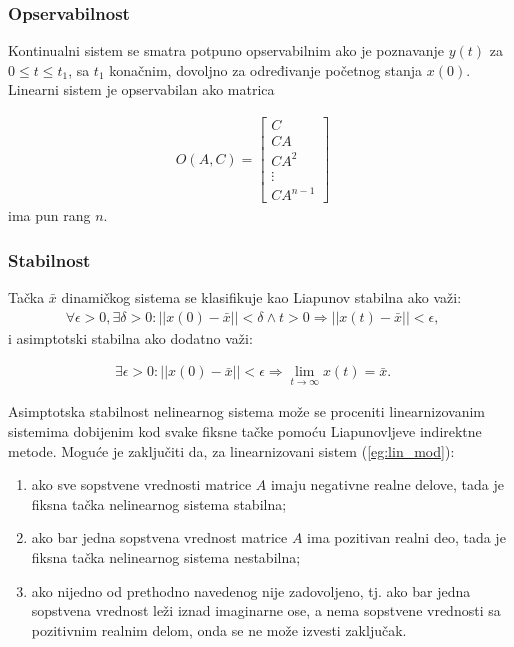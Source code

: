 \documentclass[a4paper,11pt]{article}
\theoremstyle{definition} \newtheorem{deff}{Definicija}[section]
\theoremstyle{definition} \newtheorem{prim}[deff]{Primer}
\theoremstyle{plain} \newtheorem{teor}[deff]{Teorema}
\begin{document}
	
	\subsubsection{Opservabilnost}
	
	Kontinualni sistem se smatra potpuno opservabilnim ako je poznavanje $y(t)$ za $0 \leq t \leq t_1$, sa $t_1$ konačnim, dovoljno za određivanje početnog stanja $x(0)$. \\
	
	Linearni sistem je opservabilan ako matrica
	
	\begin{align}
		O(A, C) = \begin{bmatrix}
			C \\
			CA \\
			CA^2 \\
			\vdots \\
			CA^{n-1}
		\end{bmatrix} \quad
	\end{align}
	ima pun rang $n$.
	
	\subsubsection{Stabilnost}
	
	
	
	Tačka \(\bar{x}\) dinamičkog sistema se klasifikuje kao Liapunov stabilna ako važi:
	\begin{align}
		\forall \epsilon > 0, \exists \delta > 0 : ||x(0) - \bar{x}|| < \delta \land t > 0 \Rightarrow ||x(t) - \bar{x}|| < \epsilon, \quad 
	\end{align}
	i asimptotski stabilna ako dodatno važi:
	
	\begin{align}
		\exists \epsilon > 0 : ||x(0) - \bar{x}|| < \epsilon \Rightarrow \lim_{t \to \infty} x(t) = \bar{x}. \quad
	\end{align}
	
	Asimptotska stabilnost nelinearnog sistema može se proceniti linearnizovanim sistemima dobijenim kod svake fiksne tačke pomoću Liapunovljeve indirektne metode. Moguće je zaključiti da, za linearnizovani sistem (\ref{eg:lin_mod}):
	\begin{enumerate}
		\item ako sve sopstvene vrednosti matrice \(A\) imaju negativne realne delove, tada je fiksna tačka nelinearnog sistema stabilna;
		\item ako bar jedna sopstvena vrednost matrice \(A\) ima pozitivan realni deo, tada je fiksna tačka nelinearnog sistema nestabilna;
		\item ako nijedno od prethodno navedenog nije zadovoljeno, tj. ako bar jedna sopstvena vrednost leži iznad imaginarne ose, a nema sopstvene vrednosti sa pozitivnim realnim delom, onda se ne može izvesti zaključak.
	\end{enumerate} 
	
\end{document}
